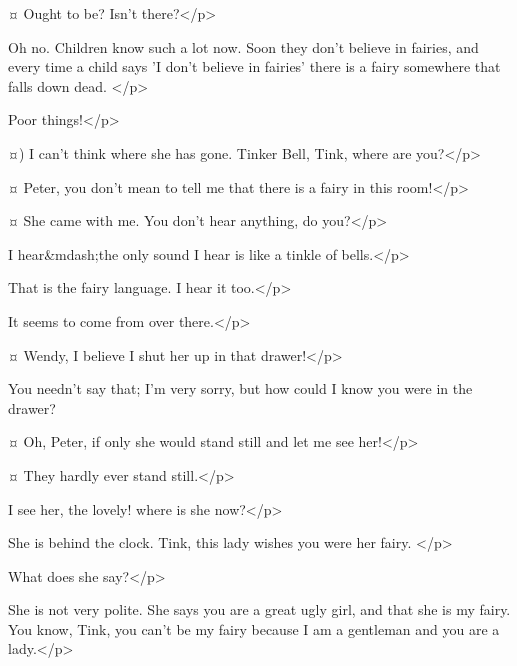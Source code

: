 \wendyspeaks {}¤
Ought to be?
Isn't there?</p>

\peterspeaks
Oh no.
Children know such a lot now.
Soon they don't believe in fairies, and every time a child says 'I don't believe in fairies' there is a fairy somewhere that falls down dead.
</p>

\wendyspeaks
Poor things!</p>

\peterspeaks {}¤)
I can't think where she has gone.
Tinker Bell, Tink, where are you?</p>

\wendyspeaks {}¤
Peter, you don't mean to tell me that there is a fairy in this room!</p>

\peterspeaks {}¤
She came with me.
You don't hear anything, do you?</p>

\wendyspeaks
I hear&mdash;the only sound I hear is like a tinkle of bells.</p>

\peterspeaks
That is the fairy language.
I hear it too.</p>

\wendyspeaks
It seems to come from over there.</p>

\peterspeaks
{}¤
Wendy, I believe I shut her up in that drawer!</p>


You needn't say that; I'm very sorry, but how could I know you were in the drawer?


\wendyspeaks {}¤
Oh, Peter, if only she would stand still and let me see her!</p>

\peterspeaks {}¤
They hardly ever stand still.</p>


\wendyspeaks
I see her, the lovely!
where is she now?</p>

\peterspeaks
She is behind the clock.
Tink, this lady wishes you were her fairy.
</p>

\wendyspeaks
What does she say?</p>

\peterspeaks
She is not very polite.
She says you are a great ugly girl, and that she is my fairy.
You know, Tink, you can't be my fairy because I am a gentleman and you are a lady.</p>

